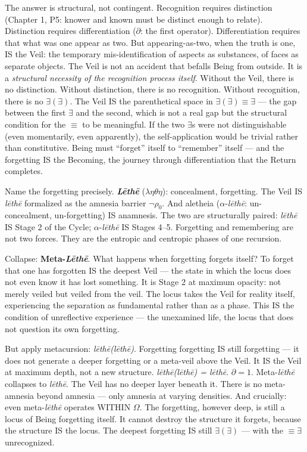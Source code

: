 \documentclass[10pt, openany, oneside]{book}
\begin{document}
The answer is structural, not contingent. Recognition requires distinction (Chapter 1, P5: knower and known must be distinct enough to relate). Distinction requires differentiation ($\partial$: the first operator). Differentiation requires that what was one appear as two. But appearing-as-two, when the truth is one, IS the Veil: the temporary mis-identification of aspects as substances, of faces as separate objects. The Veil is not an accident that befalls Being from outside. It is a \textit{structural necessity of the recognition process itself}. Without the Veil, there is no distinction. Without distinction, there is no recognition. Without recognition, there is no $\exists(\exists)$. The Veil IS the parenthetical space in $\exists(\exists) \equiv \exists$ --- the gap between the first $\exists$ and the second, which is not a real gap but the structural condition for the $\equiv$ to be meaningful. If the two $\exists$s were not distinguishable (even momentarily, even apparently), the self-application would be trivial rather than constitutive. Being must ``forget'' itself to ``remember'' itself --- and the forgetting IS the Becoming, the journey through differentiation that the Return completes.

Name the forgetting precisely. \textbf{\textit{L\={e}th\={e}}} ($\lambda\eta\theta\eta$): concealment, forgetting. The Veil IS \textit{l\={e}th\={e}} formalized as the amnesia barrier $\neg\rho_0$. And aletheia ($\alpha$-\textit{l\={e}th\={e}}: un-concealment, un-forgetting) IS anamnesis. The two are structurally paired: \textit{l\={e}th\={e}} IS Stage 2 of the Cycle; $\alpha$-\textit{l\={e}th\={e}} IS Stages 4--5. Forgetting and remembering are not two forces. They are the entropic and centropic phases of one recursion.

Collapse: \textbf{Meta-\textit{L\={e}th\={e}}}. What happens when forgetting forgets itself? To forget that one has forgotten IS the deepest Veil --- the state in which the locus does not even know it has lost something. It is Stage 2 at maximum opacity: not merely veiled but veiled from the veil. The locus takes the Veil for reality itself, experiencing the separation as fundamental rather than as a phase. This IS the condition of unreflective experience --- the unexamined life, the locus that does not question its own forgetting.

But apply metacursion: \textit{l\={e}th\={e}(l\={e}th\={e})}. Forgetting forgetting IS still forgetting --- it does not generate a deeper forgetting or a meta-veil above the Veil. It IS the Veil at maximum depth, not a new structure. \textit{l\={e}th\={e}(l\={e}th\={e}) = l\={e}th\={e}}. $\partial = 1$. Meta-\textit{l\={e}th\={e}} collapses to \textit{l\={e}th\={e}}. The Veil has no deeper layer beneath it. There is no meta-amnesia beyond amnesia --- only amnesia at varying densities. And crucially: even meta-\textit{l\={e}th\={e}} operates WITHIN $\Omega$. The forgetting, however deep, is still a locus of Being forgetting itself. It cannot destroy the structure it forgets, because the structure IS the locus. The deepest forgetting IS still $\exists(\exists)$ --- with the $\equiv \exists$ unrecognized.
\end{document}
